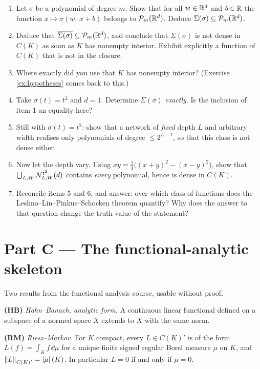 \documentclass[11pt,a4paper]{article}
\begin{document}
\begin{exercise}\label{ex:poly}
\leavevmode
\begin{enumerate}[label=\textbf{\arabic*.}]
\item Let $\sigma$ be a polynomial of degree $m$. Show that for all $w \in \mathbb{R}^d$ and $b \in \mathbb{R}$ the
function $x \mapsto \sigma(w\cdot x + b)$ belongs to $\mathcal{P}_m(\mathbb{R}^d)$. Deduce
$\Sigma(\sigma) \subseteq \mathcal{P}_m(\mathbb{R}^d)$.
\item Deduce that $\overline{\Sigma(\sigma)} \subseteq \mathcal{P}_m(\mathbb{R}^d)$, and conclude that
$\Sigma(\sigma)$ is not dense in $C(K)$ as soon as $K$ has nonempty interior. Exhibit explicitly a
function of $C(K)$ that is not in the closure.
\item Where exactly did you use that $K$ has nonempty interior? (Exercise \ref{ex:hypotheses} comes
back to this.)
\item Take $\sigma(t) = t^2$ and $d = 1$. Determine $\Sigma(\sigma)$ \emph{exactly}. Is the
inclusion of item 1 an equality here?
\item Still with $\sigma(t) = t^2$: show that a network of \emph{fixed} depth $L$ and arbitrary
width realises only polynomials of degree $\le 2^{L-1}$, so that this class is not dense either.
\item Now let the depth vary. Using $xy = \tfrac14\big((x+y)^2 - (x-y)^2\big)$, show that
$\bigcup_{L,W}\mathcal{N}^{t^2}_{L,W}(d)$ contains \emph{every} polynomial, hence is dense in $C(K)$.
\item Reconcile items 5 and 6, and answer: over which class of functions does the
Leshno--Lin--Pinkus--Schocken theorem quantify? Why does the answer to that question change the
truth value of the statement?
\end{enumerate}
\end{exercise}

\section{Part C --- The functional-analytic skeleton}

\begin{setting}
Two results from the functional analysis course, usable without proof.

\smallskip
\textbf{(HB)} \emph{Hahn--Banach, analytic form.} A continuous linear functional defined on a
subspace of a normed space $X$ extends to $X$ with the same norm.

\smallskip
\textbf{(RM)} \emph{Riesz--Markov.} For $K$ compact, every $L \in C(K)'$ is of the form
$L(f) = \int_K f\,\dd\mu$ for a unique finite signed regular Borel measure $\mu$ on $K$, and
$\left\lVert L \right\rVert_{C(K)'} = \left\lvert \mu \right\rvert(K)$. In particular $L = 0$ if and only if $\mu = 0$.
\end{setting}
\end{document}
